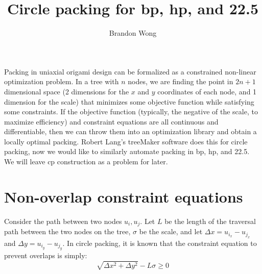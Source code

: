 \documentclass[12pt]{article}
\begin{document}
 
%
%
 
\title{Circle packing for bp, hp, and 22.5} %
\author{Brandon Wong} %
\maketitle
Packing in uniaxial origami design can be formalized as a constrained non-linear optimization problem. In a tree with $n$ nodes, we are finding the point in $2n+1$ dimensional space (2 dimensions for the $x$ and $y$ coordinates of each node, and 1 dimension for the scale) that minimizes some objective function while satisfying some constraints. If the objective function (typically, the negative of the scale, to maximize efficiency) and constraint equations are all continuous and differentiable, then we can throw them into an optimization library and obtain a locally optimal packing. Robert Lang's treeMaker software does this for circle packing, now we would like to similarly automate packing in bp, hp, and 22.5. We will leave cp construction as a problem for later.

\section{Non-overlap constraint equations}
Consider the path between two nodes $u_i,u_j$.  Let $L$ be the length of the traversal path between the two nodes on the tree, $\sigma$ be the scale, and let $\Delta x = u_{i_x} - u_{j_x}$ and $\Delta y = u_{i_y} - u_{j_y}$. In circle packing, it is known that the constraint equation to prevent overlaps is simply:
\begin{equation}\label{eq:circle}
    \sqrt{\Delta x^2 + \Delta y^2}-L\sigma \geq 0
\end{equation}
\end{document}
